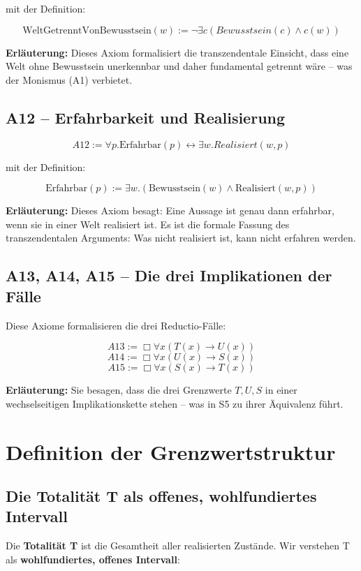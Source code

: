 \documentclass[
]{article}
\begin{document}
mit der Definition:

\[
\boxed{\text{WeltGetrenntVonBewusstsein}(w) := \neg \exists c (Bewusstsein(c) \land c(w))}
\]

\textbf{Erläuterung:} Dieses Axiom formalisiert die transzendentale Einsicht, dass eine Welt ohne Bewusstsein unerkennbar und daher fundamental getrennt wäre – was der Monismus (A1) verbietet.

\subsection{A12 – Erfahrbarkeit und Realisierung}

\[
\boxed{A12 := \forall p. \text{Erfahrbar}(p) \leftrightarrow \exists w. Realisiert(w, p)}
\]

mit der Definition:

\[
\boxed{\text{Erfahrbar}(p) := \exists w. (\text{Bewusstsein}(w) \land \text{Realisiert}(w, p))}
\]

\textbf{Erläuterung:} Dieses Axiom besagt: Eine Aussage ist genau dann erfahrbar, wenn sie in einer Welt realisiert ist. Es ist die formale Fassung des transzendentalen Arguments: Was nicht realisiert ist, kann nicht erfahren werden.

\subsection{A13, A14, A15 – Die drei Implikationen der Fälle}

Diese Axiome formalisieren die drei Reductio-Fälle:

\[
\boxed{A13 := \Box\forall x(T(x) \rightarrow U(x))}
\]
\[
\boxed{A14 := \Box\forall x(U(x) \rightarrow S(x))}
\]
\[
\boxed{A15 := \Box\forall x(S(x) \rightarrow T(x))}
\]

\textbf{Erläuterung:} Sie besagen, dass die drei Grenzwerte \(T, U, S\) in einer wechselseitigen Implikationskette stehen – was in S5 zu ihrer Äquivalenz führt.

\section{Definition der Grenzwertstruktur}

\subsection{Die Totalität T als offenes, wohlfundiertes Intervall}

Die \textbf{Totalität T} ist die Gesamtheit aller realisierten Zustände. Wir verstehen T als \textbf{wohlfundiertes, offenes Intervall}:
\end{document}
